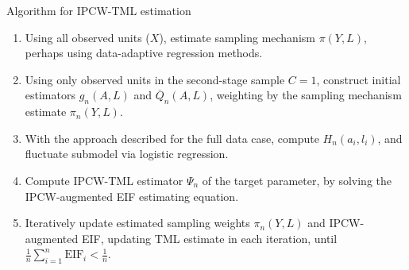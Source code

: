 \documentclass{beamer}
\begin{document}
\begin{frame}[c]{Algorithm for IPCW-TML estimation}

\begin{center}
\begin{enumerate}\label{ipcwtmle_algo}
  \itemsep8pt
  \item Using all observed units ($X$), estimate sampling mechanism
    $\pi(Y, L)$, perhaps using data-adaptive regression methods.
  \item Using only observed units in the second-stage sample $C = 1$,
    construct initial estimators $g_n(A,L)$ and $\overline{Q}_n(A,L)$,
    weighting by the sampling mechanism estimate $\pi_n(Y,L)$.
  \item With the approach described for the full data case, compute
    $H_n(a_i,l_i)$, and fluctuate submodel via logistic regression.
  \item Compute IPCW-TML estimator $\Psi_n$ of the target parameter, by solving
    the IPCW-augmented EIF estimating equation.
  \item Iteratively update estimated sampling weights $\pi_n(Y,L)$ and
    IPCW-augmented EIF, updating TML estimate in each iteration, until
    $\frac{1}{n}\sum_{i = 1}^n \text{EIF}_i < \frac{1}{n}$.
\end{enumerate}
\end{center}


\end{frame}

\end{document}
